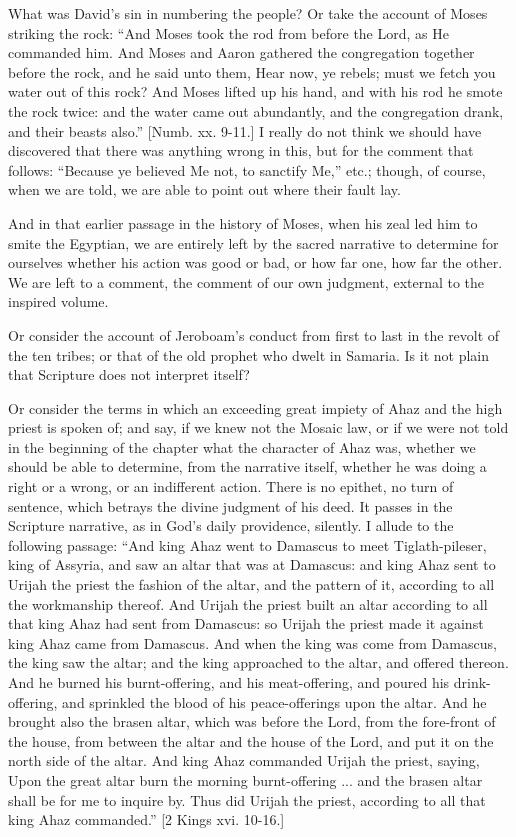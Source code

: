 What was David's sin in numbering the people? Or take the account
of Moses striking the rock: ``And Moses took the rod from before
the Lord, as He commanded him. And Moses and Aaron gathered the
congregation together before the rock, and he said unto them, Hear
now, ye rebels; must we fetch you water out of this rock? And Moses
lifted up his hand, and with his rod he smote the rock twice: and the
water came out abundantly, and the congregation drank, and their
beasts also.'' [Numb. xx. 9-11.] I really do not think we should
have discovered that there was anything wrong in this, but for the
comment that follows: ``Because ye believed Me not, to sanctify
Me,'' etc.; though, of course, when we are told, we are able to
point out where their fault lay.

And in that earlier passage in the history of Moses, when his zeal
led him to smite the Egyptian, we are entirely left by the sacred
narrative to determine for ourselves whether his action was good or
bad, or how far one, how far the other. We are left to a comment, the
comment of our own judgment, external to the inspired volume.

Or consider the account of Jeroboam's conduct from first to last in
the revolt of the ten tribes; or that of the old prophet who dwelt in
Samaria. Is it not plain that Scripture does not interpret itself?

Or consider the terms in which an exceeding great impiety of Ahaz
and the high priest is spoken of; and say, if we knew not the Mosaic
law, or if we were not told in the beginning of the chapter what the
character of Ahaz was, whether we should be able to determine, from
the narrative itself, whether he was doing a right or a wrong, or an
indifferent action. There is no epithet, no turn of sentence, which
betrays the divine judgment of his deed. It passes in the Scripture
narrative, as in God's daily providence, silently. I allude to the
following passage: ``And king Ahaz went to Damascus to meet
Tiglath-pileser, king of Assyria, and saw an altar that was at
Damascus: and king Ahaz sent to Urijah the priest the fashion of the
altar, and the pattern of it, according to all the workmanship
thereof. And Urijah the priest built an altar according to all that
king Ahaz had sent from Damascus: so Urijah the priest made it against
king Ahaz came from Damascus. And when the king was come from
Damascus, the king saw the altar; and the king approached to the
altar, and offered thereon. And he burned his burnt-offering, and his
meat-offering, and poured his drink-offering, and sprinkled the blood
of his peace-offerings upon the altar. And he brought also the brasen
altar, which was before the Lord, from the fore-front of the house,
from between the altar and the house of the Lord, and put it on the
north side of the altar. And king Ahaz commanded Urijah the priest,
saying, Upon the great altar burn the morning burnt-offering ... and
the brasen altar shall be for me to inquire by. Thus did Urijah
the priest, according to all that king Ahaz commanded.'' [2 Kings
xvi. 10-16.]

